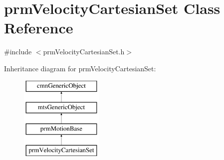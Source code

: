 \hypertarget{classprm_velocity_cartesian_set}{\section{prm\-Velocity\-Cartesian\-Set Class Reference}
\label{classprm_velocity_cartesian_set}
}


{\ttfamily \#include $<$prm\-Velocity\-Cartesian\-Set.\-h$>$}

Inheritance diagram for prm\-Velocity\-Cartesian\-Set\-:\begin{figure}[H]
\begin{center}
\leavevmode
\includegraphics[height=4.000000cm]{d1/dd2/classprm_velocity_cartesian_set}
\end{center}
\end{figure}
